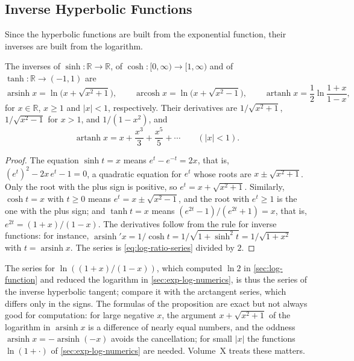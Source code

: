 \subsection{Inverse Hyperbolic Functions}

Since the hyperbolic functions are built from the exponential function, their inverses are built from the logarithm.

\begin{proposition}
\label{prop:inverse-hyperbolic}
The inverses of $\sinh\colon\mathbb R\to\mathbb R$, of $\cosh\colon[0,\infty)\to[1,\infty)$ and of $\tanh\colon\mathbb R\to(-1,1)$ are
\[
\operatorname{arsinh}x=\ln\bigl(x+\sqrt{x^2+1}\bigr),\qquad\operatorname{arcosh}x=\ln\bigl(x+\sqrt{x^2-1}\bigr),\qquad\operatorname{artanh}x=\frac12\ln\frac{1+x}{1-x},
\]
for $x\in\mathbb R$, $x\ge1$ and $|x|<1$, respectively. Their derivatives are $1/\sqrt{x^2+1}$, $1/\sqrt{x^2-1}$ for $x>1$, and $1/(1-x^2)$, and
\[
\operatorname{artanh}x=x+\frac{x^3}3+\frac{x^5}5+\cdots\qquad(|x|<1).
\]
\end{proposition}

\begin{proof}
The equation $\sinh t=x$ means $e^t-e^{-t}=2x$, that is, $(e^t)^2-2x\,e^t-1=0$, a quadratic equation for $e^t$ whose roots are $x\pm\sqrt{x^2+1}$. Only the root with the plus sign is positive, so $e^t=x+\sqrt{x^2+1}$. Similarly, $\cosh t=x$ with $t\ge0$ means $e^t=x\pm\sqrt{x^2-1}$, and the root with $e^t\ge1$ is the one with the plus sign; and $\tanh t=x$ means $(e^{2t}-1)/(e^{2t}+1)=x$, that is, $e^{2t}=(1+x)/(1-x)$. The derivatives follow from the rule for inverse functions: for instance, $\operatorname{arsinh}'x=1/\cosh t=1/\sqrt{1+\sinh^2t}=1/\sqrt{1+x^2}$ with $t=\operatorname{arsinh}x$. The series is \eqref{eq:log-ratio-series} divided by $2$.
\end{proof}

The series for $\ln((1+x)/(1-x))$, which computed $\ln2$ in \cref{sec:log-function} and reduced the logarithm in \cref{sec:exp-log-numerics}, is thus the series of the inverse hyperbolic tangent; compare it with the arctangent series, which differs only in the signs. The formulas of the proposition are exact but not always good for computation: for large negative $x$, the argument $x+\sqrt{x^2+1}$ of the logarithm in $\operatorname{arsinh}x$ is a difference of nearly equal numbers, and the oddness $\operatorname{arsinh}x=-\operatorname{arsinh}(-x)$ avoids the cancellation; for small $|x|$ the functions $\ln(1+\cdot)$ of \cref{sec:exp-log-numerics} are needed. Volume~X treats these matters.

